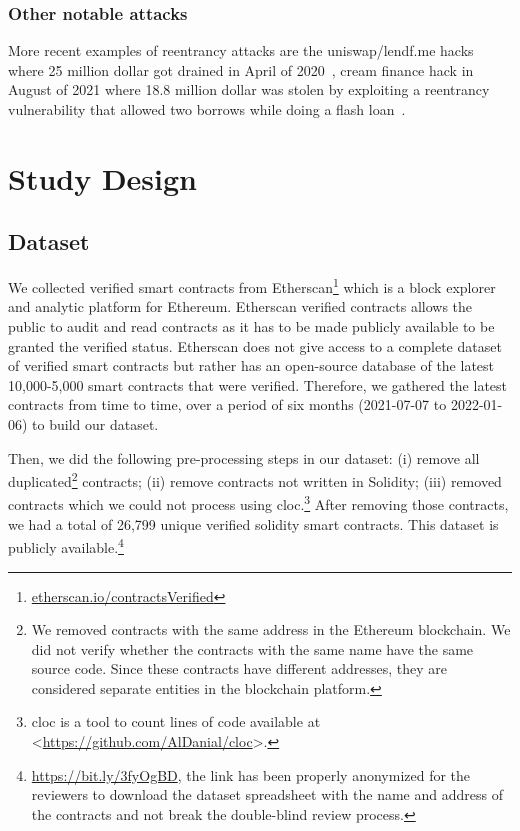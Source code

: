 \documentclass[10pt,conference]{IEEEtran}
\newcommand{\totalContracts}{26,799\xspace}
\begin{document}
\subsubsection{Other notable attacks}
More recent examples of reentrancy attacks are the uniswap/lendf.me hacks where 25 million dollar got drained in April of 2020~\cite{lendf}, cream finance hack in August of 2021 where 18.8 million dollar was stolen by exploiting a reentrancy vulnerability that allowed two borrows while doing a flash loan~\cite{cream}.
\section{Study Design}
\subsection{Dataset}

We collected verified smart contracts from Etherscan\footnote{\url{etherscan.io/contractsVerified}} which is a block explorer and analytic platform for Ethereum. Etherscan verified contracts allows the public to audit and read contracts as it has to be made publicly available to be granted the verified status. Etherscan does not give access to a complete dataset of verified smart contracts but rather has an open-source database of the latest 10,000-5,000 smart contracts that were verified. Therefore, we gathered the latest contracts from time to time, over a period of six months (2021-07-07 to 2022-01-06) to build our dataset.

Then, we did the following pre-processing steps in our dataset: (i) remove all duplicated\footnote{We removed contracts with the same address in the Ethereum blockchain. We did not verify whether the contracts with the same name have the same source code. Since these contracts have different addresses, they are considered separate entities in the blockchain platform.} contracts; (ii) remove contracts not written in Solidity; (iii) removed contracts which we could not process using cloc.\footnote{cloc is a tool to count lines of code available at <\url{https://github.com/AlDanial/cloc}>.} After removing those contracts, we had a total of \totalContracts unique verified solidity smart contracts. This dataset is publicly available.\footnote{\url{https://bit.ly/3fyOgBD}, the link has been properly anonymized for the reviewers to download the dataset spreadsheet with the name and address of the contracts and not break the double-blind review process.}
\end{document}
